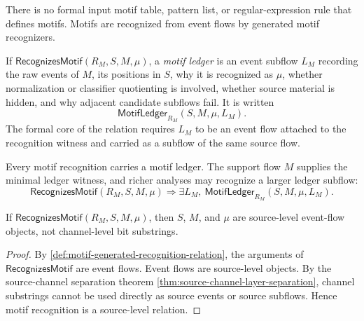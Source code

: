 \begin{principle}
\label{prin:motif-generated-no-external-input}
There is no formal input motif table, pattern list, or regular-expression rule that defines motifs. Motifs are recognized from event flows by generated motif recognizers.
\end{principle}

\begin{definition}
\label{def:motif-generated-ledger}
If $\mathsf{RecognizesMotif}(R_M,S,M,\mu)$, a \emph{motif ledger} is an event subflow $L_M$ recording the raw events of $M$, its positions in $S$, why it is recognized as $\mu$, whether normalization or classifier quotienting is involved, whether source material is hidden, and why adjacent candidate subflows fail. It is written
$$
  \mathsf{MotifLedger}_{R_M}(S,M,\mu,L_M).
$$
The formal core of the relation requires $L_M$ to be an event flow attached to the recognition witness and carried as a subflow of the same source flow.
\end{definition}

\begin{principle}
\label{prin:motif-generated-no-motif-without-ledger}
Every motif recognition carries a motif ledger. The support flow $M$ supplies the minimal ledger witness, and richer analyses may recognize a larger ledger subflow:
$$
  \mathsf{RecognizesMotif}(R_M,S,M,\mu)
  \Longrightarrow
  \exists L_M,\ \mathsf{MotifLedger}_{R_M}(S,M,\mu,L_M).
$$
\end{principle}

\begin{theorem}
\label{thm:motif-generated-source-level}
If $\mathsf{RecognizesMotif}(R_M,S,M,\mu)$, then $S$, $M$, and $\mu$ are source-level event-flow objects, not channel-level bit substrings.
\end{theorem}

\begin{proof}
By \autoref{def:motif-generated-recognition-relation}, the arguments of $\mathsf{RecognizesMotif}$ are event flows. Event flows are source-level objects. By the source-channel separation theorem \autoref{thm:source-channel-layer-separation}, channel substrings cannot be used directly as source events or source subflows. Hence motif recognition is a source-level relation.
\end{proof}

